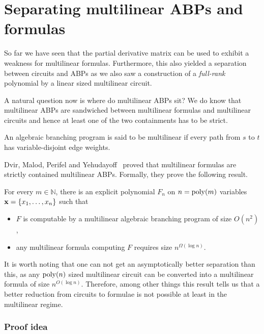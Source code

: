 \chapter{Separating multilinear ABPs and formulas}\label{chap:DMPY}

So far we have seen that the partial derivative matrix can be used to exhibit a weakness for multilinear formulas.
Furthermore, this also yielded a separation between circuits and ABPs as we also saw a construction of a \emph{full-rank} polynomial by a linear sized multilinear circuit.

A natural question now is where do multilinear ABPs sit? We do know that multilinear ABPs are sandwiched between multilinear formulas and multilinear circuits and hence at least one of the two containments has to be strict.

\begin{definition}
An algebraic branching program is said to be multilinear if every path from $s$ to $t$ has variable-disjoint edge weights. 
\end{definition}

Dvir, Malod, Perifel and Yehudayoff~\cite{dmpy12} proved that multilinear formulas are strictly contained multilinear ABPs. Formally, they prove the following result.

\begin{theorem}
\label{thm:separation}
For every $m \in \mathbb{N}$, there is an explicit polynomial $F_n$ on $n = \operatorname{poly}(m)$ variables $\mathbf{x} = \left\{x_1,\ldots,x_n\right\}$ such that
\begin{itemize}
\item $F$ is computable by a multilinear algebraic branching program of size $O(n^2)$,
\item any multilinear formula computing $F$ requires size $n^{\Omega(\log n)}$.
\end{itemize}
\end{theorem}

It is worth noting that one can not get an asymptotically better separation than this, as any $\operatorname{poly}(n)$ sized multilinear circuit can be converted into a multilinear formula of size $n^{O(\log n)}$.
Therefore, among other things this result tells us that a better reduction from circuits to formulae is not possible at least in the multilinear regime.

\subsection*{Proof idea}

